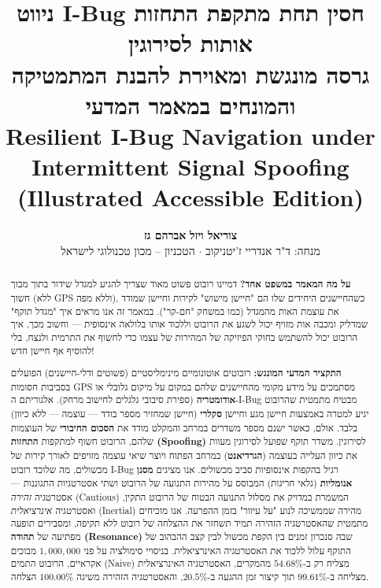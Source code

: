 \documentclass[11pt, a4paper]{article}
\title{\vspace{-1.2em}\Large\textbf{ניווט \foreignlanguage{english}{I-Bug} חסין תחת מתקפת התחזות אותות לסירוגין}\\
\large\textbf{גרסה מונגשת ומאוירת להבנת המתמטיקה והמונחים במאמר המדעי}\\[0.4ex]
\normalsize\foreignlanguage{english}{\textbf{Resilient I-Bug Navigation under Intermittent Signal Spoofing (Illustrated Accessible Edition)}}}
\author{
  \textbf{צוריאל ויזל} \quad \textbf{אברהם גז} \\
  \small מנחה: ד"ר אנדריי ז'יטניקוב $\cdot$ הטכניון -- מכון טכנולוגי לישראל
}
\date{}
\begin{document}
\maketitle

\begin{abstract}
\noindent
\textbf{על מה המאמר במשפט אחד?} דמיינו רובוט פשוט מאוד שצריך להגיע למגדל שידור בתוך מבוך חשוך (ללא \foreignlanguage{english}{GPS} וללא מפה), כשהחיישנים היחידים שלו הם "חיישן מישוש" לקירות וחיישן שמודד את עוצמת האות מהמגדל (כמו במשחק "חם-קר"). במאמר זה אנו מראים איך "מגדל תוקף" שמדליק ומכבה אות מזויף יכול לשגע את הרובוט וללכוד אותו בלולאה אינסופית — וחשוב מכך, איך הרובוט יכול להשתמש בחוקי הפיזיקה של המהירות של עצמו כדי לחשוף את התרמית ולנצח, בלי להוסיף אף חיישן חדש!

\smallskip
\noindent
\textbf{התקציר המדעי המונגש:}
רובוטים אוטונומיים מינימליסטיים (פשוטים ודלי-חיישנים) הפועלים בסביבות חסומות \foreignlanguage{english}{GPS} מסתמכים על מידע מקומי מהחיישנים שלהם במקום על מיקום גלובלי או \textbf{אודומטריה} (ספירת סיבובי גלגלים לחישוב מרחק). אלגוריתם ה-\foreignlanguage{english}{I-Bug} מבטיח מתמטית שהרובוט יגיע למטרה באמצעות חיישן מגע וחיישן \textbf{סקלרי} (חיישן שמחזיר מספר בודד — עוצמה — ללא כיוון) בלבד. אולם, כאשר ישנם מספר משדרים במרחב והמקלט מודד את \textbf{הסכום החיבורי} של העוצמות שלהם, הרובוט חשוף למתקפות \textbf{התחזות (\foreignlanguage{english}{Spoofing})} לסירוגין. משדר תוקף שפועל לסירוגין מעוות את כיוון העלייה בעוצמה (\textbf{הגרדיאנט}) במרחב הפתוח ויוצר שיאי עוצמה מזויפים לאורך קירות של מכשולים, מה שלוכד רובוט \foreignlanguage{english}{I-Bug} רגיל בהקפות אינסופיות סביב מכשולים. אנו מציגים \textbf{מסנן אנומליות} (גלאי חריגות) המבוסס על מהירות התנועה של הרובוט ושתי אסטרטגיות התגוננות — אסטרטגיה \textit{זהירה} (\foreignlanguage{english}{Cautious}) המשמרת במדויק את מסלול התנועה הבטוח של הרובוט התקין, ואסטרטגיה \textit{אינרציאלית} (\foreignlanguage{english}{Inertial}) מהירה שממשיכה לנוע "על עיוור" בזמן ההפרעה. אנו מוכיחים מתמטית שהאסטרטגיה הזהירה תמיד תשחזר את ההצלחה של רובוט ללא תקיפה, ומסבירים תופעה מפתיעה של \textbf{תהודה (\foreignlanguage{english}{Resonance})} שבה סנכרון זמנים בין הקפת מכשול לבין קצב ההבהוב של התוקף עלול ללכוד את האסטרטגיה האינרציאלית. בניסויי סימולציה על פני $1,000,000$ מבוכים אקראיים, הרובוט התמים (\foreignlanguage{english}{Naive}) מצליח רק ב-$54.68\%$ מהמקרים, האסטרטגיה האינרציאלית מצליחה ב-$99.61\%$ תוך קיצור זמן ההגעה ב-$20.5\%$, והאסטרטגיה הזהירה משיגה $\mathbf{100.00\%}$ הצלחה.
\end{abstract}
\end{document}
